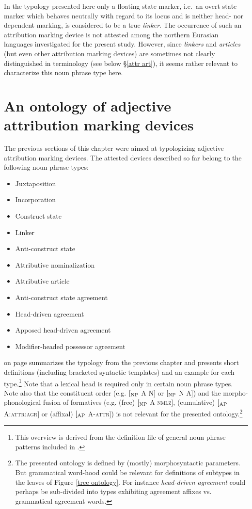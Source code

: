In the typology presented here only a floating state marker, i.e.~an overt state marker which behaves neutrally with regard to its locus and is neither head- nor dependent marking, is considered to be a true \emph{linker}. The occurrence of such an attribution marking device is not attested among the northern Eurasian languages investigated for the present study. However, since \emph{linkers} and \emph{articles} (but even other attribution marking devices) are sometimes not clearly distinguished in terminology (see below \S\ref{attr art}), it seems rather relevant to characterize this noun phrase type here.


\section[Ontology of attribution marking]{An ontology of adjective attribution marking devices}
The previous sections of this chapter were aimed at typologizing adjective attribution marking devices. The attested devices described so far belong to the following noun phrase types:
\begin{itemize}
\item{Juxtaposition}
\item{Incorporation}
\item{Construct state}
\item{Linker}
\item{Anti-construct state}
\item{Attributive nominalization}
\item{Attributive article}
\item{Anti-construct state agreement}
\item{Head-driven agreement}
\item{Apposed head-driven agreement}
\item{Modifier-headed possessor agreement}
\end{itemize}
 on page \pageref{tabledefontology} summarizes the typology from the previous chapter and presents short definitions (including bracketed syntactic templates) and an example for each type.\footnote{This overview is derived from the definition file of general noun phrase patterns included in \citet{AUTOTYP-NP}.} Note that a lexical head is required only in certain noun phrase types. Note also that the constituent order (e.g. $[_{\rm NP}$ A N$]$ or $[_{\rm NP}$ N A$]$) and the morpho-phonological fusion of formatives (e.g. (free) $[_{\rm NP}$ A \textsc{nmlz}$]$, (cumulative) $[_{\rm AP}$ A:\textsc{attr:agr}$]$ or (affixal) $[_{\rm AP}$ A-\textsc{attr}$]$) is not relevant for the presented ontology.\footnote{The presented ontology is defined by (mostly) morphosyntactic parameters. But grammatical word-hood could be relevant for definitions of subtypes in the leaves of Figure \ref{tree ontology}. For instance \textit{head-driven agreement} could perhaps be sub-divided into types exhibiting agreement affixes vs. grammatical agreement words.}


